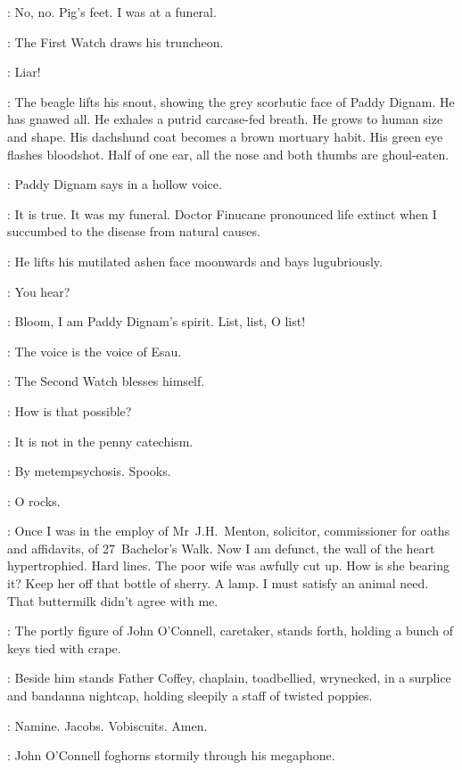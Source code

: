\Bloom:
No, no.
Pig's feet.
I was at a funeral.

:
The First Watch draws his truncheon.

\FirstWatch:
Liar!

:
The beagle lifts his snout, showing the grey scorbutic face of Paddy Dignam.
He has gnawed all.
He exhales a putrid carcase-fed breath.
He grows to human size and shape.
His dachshund coat becomes a brown mortuary habit.
His green eye flashes bloodshot.
Half of one ear, all the nose and both thumbs are ghoul-eaten.

:
Paddy Dignam says in a hollow voice.

\Dignam:
It is true.
It was my funeral.
Doctor Finucane pronounced life extinct
when I succumbed to the disease from natural causes.

:
He lifts his mutilated ashen face moonwards and bays lugubriously.

\Bloom:
You hear?

\Dignam:
Bloom, I am Paddy Dignam's spirit.
List, list, O list!

\Bloom:
The voice is the voice of Esau.

:
The Second Watch blesses himself.

\SecondWatch:
How is that possible?

\FirstWatch:
It is not in the penny catechism.

\Dignam:
By metempsychosis. Spooks.

\Voice:
O rocks.

\Dignam:
Once I was in the employ of Mr~J.H.~Menton,
solicitor, commissioner for oaths and affidavits, of 27~Bachelor's Walk.
Now I am defunct, the wall of the heart hypertrophied.
Hard lines.
The poor wife was awfully cut up.
How is she bearing it?
Keep her off that bottle of sherry.
A lamp.
I must satisfy an animal need.
That buttermilk didn't agree with me.

:
The portly figure of John O'Connell, caretaker, stands forth,
holding a bunch of keys tied with crape.

:
Beside him stands Father Coffey, chaplain,
toadbellied, wrynecked, in a surplice and bandanna nightcap,
holding sleepily a staff of twisted poppies.

\FrCoffey:
Namine.
Jacobs.
Vobiscuits.
Amen.

:
John O'Connell foghorns stormily through his megaphone.


